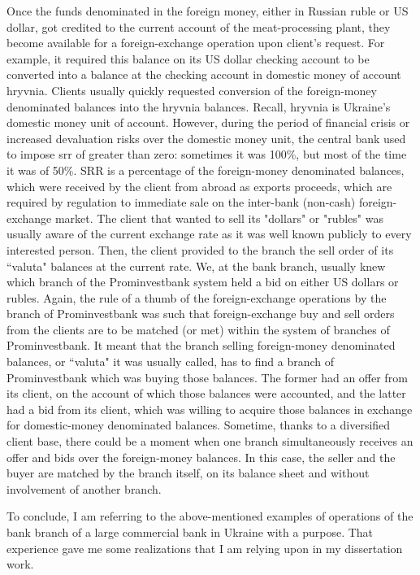 Once the funds denominated in the foreign money, either in Russian ruble or US dollar, got credited to the current account of the meat-processing plant, they become available for a foreign-exchange operation upon client's request. For example, it required this balance on its US dollar checking account to be converted into a balance at the checking account in domestic money of account hryvnia. Clients usually quickly requested conversion of the foreign-money denominated balances into the hryvnia balances. Recall, hryvnia is Ukraine's domestic money unit of account. However, during the period of financial crisis or increased devaluation risks over the domestic money unit, the central bank used to impose \ac{srr} of greater than zero: sometimes it was 100\%, but most of the time it was of 50\%. SRR is a percentage of the foreign-money denominated balances, which  were received by the client from abroad as exports proceeds, which are required by regulation to immediate sale on the inter-bank (non-cash) foreign-exchange market. The client that wanted to sell its "dollars" or "rubles" was usually aware of the current exchange rate as it was well known publicly to every interested person. Then, the client provided to the branch the sell order of its ``valuta" balances at the current rate. We, at the bank branch, usually knew which branch of the Prominvestbank system held a bid on either US dollars or rubles. Again, the rule of a thumb of the foreign-exchange operations by the branch of Prominvestbank was such that foreign-exchange buy and sell orders from the clients are to be matched (or met) within the system of branches of Prominvestbank. It meant that the branch selling foreign-money denominated balances, or ``valuta" it was usually called, has to find a branch of Prominvestbank which was buying those balances. The former had an offer from its client, on the account of which those balances were accounted, and the latter had a bid from its client, which was willing to acquire those balances in exchange for domestic-money denominated balances. Sometime, thanks to a diversified client base, there could be a moment when one branch simultaneously receives an offer and bids over the foreign-money balances. In this case, the seller and the buyer are matched by the branch itself, on its balance sheet and without involvement of another branch. 

To conclude, I am referring to the above-mentioned examples of operations of the bank branch of a large commercial bank in Ukraine with a purpose. That experience gave me some realizations that I am relying upon in my dissertation work. 


